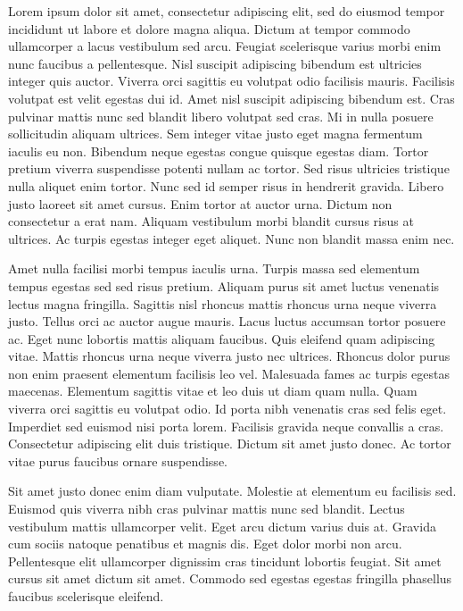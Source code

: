 \documentclass[epsf,a4paper]{book}
\begin{document}
Lorem ipsum dolor sit amet, consectetur adipiscing elit, sed do eiusmod tempor incididunt ut labore et dolore magna aliqua. Dictum at tempor commodo ullamcorper a lacus vestibulum sed arcu. Feugiat scelerisque varius morbi enim nunc faucibus a pellentesque. Nisl suscipit adipiscing bibendum est ultricies integer quis auctor. Viverra orci sagittis eu volutpat odio facilisis mauris. Facilisis volutpat est velit egestas dui id. Amet nisl suscipit adipiscing bibendum est. Cras pulvinar mattis nunc sed blandit libero volutpat sed cras. Mi in nulla posuere sollicitudin aliquam ultrices. Sem integer vitae justo eget magna fermentum iaculis eu non. Bibendum neque egestas congue quisque egestas diam. Tortor pretium viverra suspendisse potenti nullam ac tortor. Sed risus ultricies tristique nulla aliquet enim tortor. Nunc sed id semper risus in hendrerit gravida. Libero justo laoreet sit amet cursus. Enim tortor at auctor urna. Dictum non consectetur a erat nam. Aliquam vestibulum morbi blandit cursus risus at ultrices. Ac turpis egestas integer eget aliquet. Nunc non blandit massa enim nec.

Amet nulla facilisi morbi tempus iaculis urna. Turpis massa sed elementum tempus egestas sed sed risus pretium. Aliquam purus sit amet luctus venenatis lectus magna fringilla. Sagittis nisl rhoncus mattis rhoncus urna neque viverra justo. Tellus orci ac auctor augue mauris. Lacus luctus accumsan tortor posuere ac. Eget nunc lobortis mattis aliquam faucibus. Quis eleifend quam adipiscing vitae. Mattis rhoncus urna neque viverra justo nec ultrices. Rhoncus dolor purus non enim praesent elementum facilisis leo vel. Malesuada fames ac turpis egestas maecenas. Elementum sagittis vitae et leo duis ut diam quam nulla. Quam viverra orci sagittis eu volutpat odio. Id porta nibh venenatis cras sed felis eget. Imperdiet sed euismod nisi porta lorem. Facilisis gravida neque convallis a cras. Consectetur adipiscing elit duis tristique. Dictum sit amet justo donec. Ac tortor vitae purus faucibus ornare suspendisse.

Sit amet justo donec enim diam vulputate. Molestie at elementum eu facilisis sed. Euismod quis viverra nibh cras pulvinar mattis nunc sed blandit. Lectus vestibulum mattis ullamcorper velit. Eget arcu dictum varius duis at. Gravida cum sociis natoque penatibus et magnis dis. Eget dolor morbi non arcu. Pellentesque elit ullamcorper dignissim cras tincidunt lobortis feugiat. Sit amet cursus sit amet dictum sit amet. Commodo sed egestas egestas fringilla phasellus faucibus scelerisque eleifend.
\end{document}
